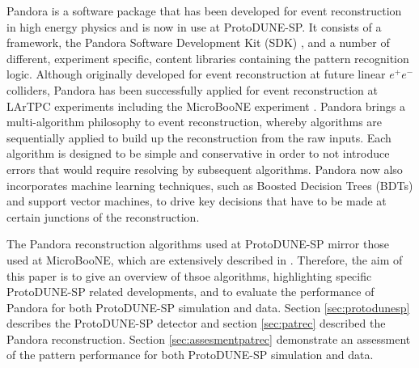 Pandora is a software package that has been developed for event reconstruction in high energy physics and is now in use at ProtoDUNE-SP.  It consists of a framework, the Pandora Software Development Kit (SDK) \cite{pandorasdk}, and a number of different, experiment specific, content libraries containing the pattern recognition logic.  Although originally developed for event reconstruction at future linear $e^{+}e^{-}$ colliders, Pandora has been successfully applied for event reconstruction at LArTPC experiments including the MicroBooNE experiment \cite{pandorauboone}.  Pandora brings a multi-algorithm philosophy to event reconstruction, whereby algorithms are sequentially applied to build up the reconstruction from the raw inputs.  Each algorithm is designed to be simple and conservative in order to not introduce errors that would require resolving by subsequent algorithms.  Pandora now also incorporates machine learning techniques, such as Boosted Decision Trees (BDTs) and support vector machines, to drive key decisions that have to be made at certain junctions of the reconstruction. 

The Pandora reconstruction algorithms used at ProtoDUNE-SP mirror those used at MicroBooNE, which are extensively described in \cite{pandorauboone}.  Therefore, the aim of this paper is to give an overview of thsoe algorithms, highlighting specific ProtoDUNE-SP related developments, and to evaluate the performance of Pandora for both ProtoDUNE-SP simulation and data.  Section \ref{sec:protodunesp} describes the ProtoDUNE-SP detector and section \ref{sec:patrec} described the Pandora reconstruction.  Section \ref{sec:assesmentpatrec} demonstrate an assessment of the pattern performance for both ProtoDUNE-SP simulation and data.  


